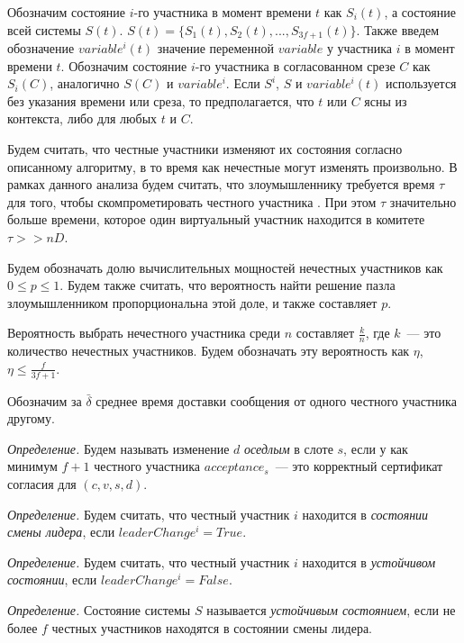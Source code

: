 Обозначим состояние $i$-го участника в момент времени $t$ как $S_i(t)$, а состояние всей системы $S(t)$. 
$S(t)=\{S_1(t), S_2(t),..., S_{3f+1}(t)\}$. Также введем обозначение $variable^i(t)$ значение переменной $variable$ у участника $i$ в момент времени $t$.
Обозначим состояние $i$-го участника в согласованном срезе $C$ как $S_i(C)$, аналогично $S(C)$ и $variable^i$.
Если $S^i$, $S$ и $variable^i(t)$ используется без указания времени или среза, то предполагается, что $t$ или $C$ ясны из контекста, либо для любых $t$ и $C$.

Будем считать, что честные участники изменяют их состояния согласно описанному алгоритму, в то время как нечестные могут изменять произвольно.
В рамках данного анализа будем считать, что злоумышленнику требуется время $\tau$ для того, чтобы скомпрометировать  честного участника \cite{hybrid-consensus}. При этом $\tau$ значительно больше времени, которое один виртуальный участник находится в комитете $\tau >> nD$.

Будем обозначать долю вычислительных мощностей нечестных участников как $0 \le p \le 1$. Будем также считать, что вероятность найти решение пазла злоумышленником пропорциональна этой доле, и также составляет $p$. 

Вероятность выбрать нечестного участника среди $n$ составляет $\frac{k}{n}$, где $k$~--- это количество нечестных участников. Будем обозначать эту вероятность как $\eta$, $\eta \le \frac{f}{3f+1}$.
\vspace{10pt}

Обозначим за $\bar{\delta}$ среднее время доставки сообщения от одного честного участника другому. 

\textit{Определение.} Будем называть изменение $d$ \textit{оседлым} в слоте $s$, если у как минимум $f+1$ честного участника $acceptance_s$~--- это корректный сертификат согласия для $(c, v, s, d)$.

\textit{Определение.} Будем считать, что честный участник $i$ находится в \textit{состоянии смены лидера}, если $leaderChange^i = True$.

\textit{Определение.} Будем считать, что честный участник $i$ находится в \textit{устойчивом состоянии}, если $leaderChange^i = False$.

\textit{Определение.} Состояние системы $S$ называется \textit{устойчивым состоянием}, если не более $f$ честных участников находятся в состоянии смены лидера. 

